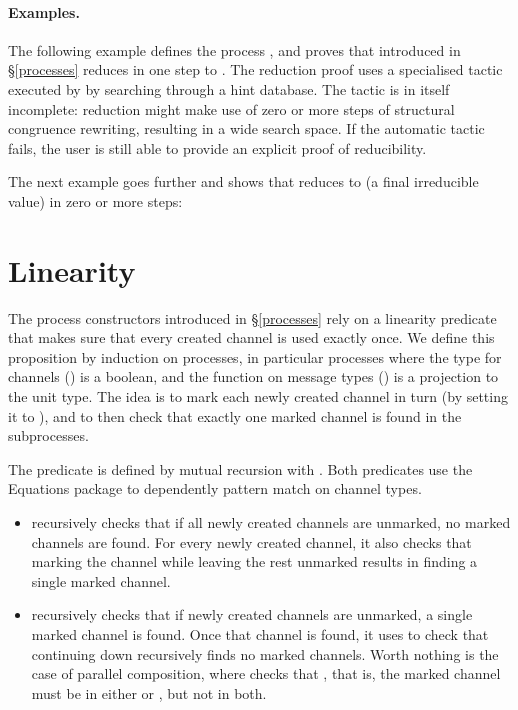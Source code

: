 \documentclass{mproj}
\begin{document}
\paragraph{Examples.}

The following example defines the process , and proves that  introduced in \S \ref{processes} reduces in one step to . The reduction proof uses a specialised tactic executed by  by searching through a hint database. The tactic is in itself incomplete: reduction might make use of zero or more steps of structural congruence rewriting, resulting in a wide search space. If the automatic tactic fails, the user is still able to provide an explicit proof of reducibility.


The next example goes further and shows that  reduces to  (a final irreducible value) in zero or more steps:


\section{Linearity}\label{linearity}

The process constructors introduced in \S \ref{processes} rely on a linearity predicate that makes sure that every created channel is used exactly once. We define this proposition by induction on processes, in particular processes where the type for channels () is a boolean, and the function on message types () is a projection to the unit type. The idea is to mark each newly created channel in turn (by setting it to ), and to then check that exactly one marked channel is found in the subprocesses.


The predicate  is defined by mutual recursion with . Both predicates use the Equations package to dependently pattern match on channel types.
\begin{itemize}
    \item {} recursively checks that if all newly created channels are unmarked, no marked channels are found. For every newly created channel, it also checks that marking the channel while leaving the rest unmarked results in  finding a single marked channel.  

    \item {} recursively checks that if newly created channels are unmarked, a single marked channel is found. Once that channel is found, it uses  to check that continuing down recursively finds no marked channels. Worth nothing is the case of parallel composition, where  checks that , that is, the marked channel must be in either  or , but not in both.
\end{itemize}
\end{document}
